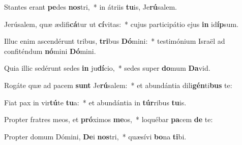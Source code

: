 \item Stantes erant \textbf{pe}des \textbf{nos}tri,~* in átriis \textbf{tu}is, Je\textbf{rú}salem.
\item Jerúsalem, quæ ædifi\textbf{cá}tur ut \textbf{cí}vitas:~* cujus participátio ejus \textbf{in} id\textbf{íp}sum.
\item Illuc enim ascendérunt tribus, \textbf{tri}bus \textbf{Dó}mini:~* testimónium Israël ad confiténdum \textbf{nó}mini \textbf{Dó}mini.
\item Quia illic sedérunt sedes \textbf{in} ju\textbf{dí}cio,~* sedes super \textbf{do}mum \textbf{Da}vid.
\item Rogáte quæ ad pacem \textbf{sunt} Je\textbf{rú}salem:~* et abundántia dili\textbf{gén}ti\textbf{bus} te:
\item Fiat pax in vir\textbf{tú}te \textbf{tu}a:~* et abundántia in \textbf{túr}ribus \textbf{tu}is.
\item Propter fratres meos, et \textbf{pró}ximos \textbf{me}os,~* loquébar \textbf{pa}cem \textbf{de} te:
\item Propter domum Dómini, \textbf{De}i \textbf{nos}tri,~* quæsívi \textbf{bo}na \textbf{ti}bi.
